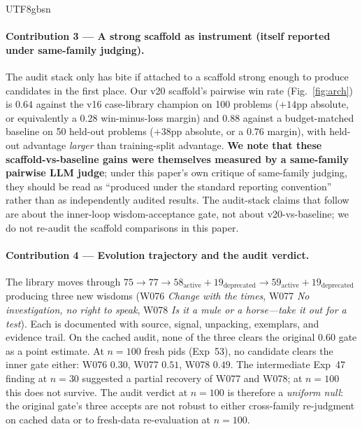 \documentclass{article}
\begin{document}
\begin{CJK*}{UTF8}{gbsn}
\paragraph{Contribution 3 — A strong scaffold as instrument
(itself reported under same-family judging).} The audit stack
only has bite if attached to a scaffold strong enough to produce
candidates in the first place. Our v20 scaffold's pairwise win
rate (Fig.~\ref{fig:arch}) is \(0.64\) against the v16
case-library champion on 100 problems (\(+14\)pp absolute, or
equivalently a \(0.28\) win-minus-loss margin) and \(0.88\)
against a budget-matched baseline on 50 held-out problems
(\(+38\)pp absolute, or a \(0.76\) margin), with held-out
advantage \emph{larger} than training-split advantage. \textbf{We
note that these scaffold-vs-baseline gains were themselves
measured by a same-family pairwise LLM judge}; under this paper's
own critique of same-family judging, they should be read as
``produced under the standard reporting convention'' rather than
as independently audited results. The audit-stack claims that
follow are about the inner-loop wisdom-acceptance gate, not about
v20-vs-baseline; we do not re-audit the scaffold comparisons in
this paper.

\paragraph{Contribution 4 — Evolution trajectory and the audit
verdict.} The library moves through
\(75 \to 77 \to 58_{\text{active}} + 19_{\text{deprecated}} \to
59_{\text{active}} + 19_{\text{deprecated}}\) producing three new
wisdoms (W076 \emph{Change with the times}, W077 \emph{No
investigation, no right to speak}, W078 \emph{Is it a mule or a
horse—take it out for a test}). Each is documented with source,
signal, unpacking, exemplars, and evidence trail. On the cached
audit, none of the three clears the original \(0.60\) gate as a
point estimate. At \(n=100\) fresh pids (Exp~53), no candidate
clears the inner gate either: W076 \(0.30\), W077 \(0.51\),
W078 \(0.49\). The intermediate Exp~47 finding at \(n=30\)
suggested a partial recovery of W077 and W078; at \(n=100\) this
does not survive. The audit verdict at \(n=100\) is
therefore a \emph{uniform null}: the original gate's three
accepts are not robust to either cross-family re-judgment on
cached data or to fresh-data re-evaluation at \(n=100\).


\end{CJK*}
\end{document}
